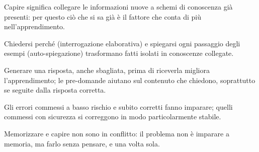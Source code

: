 \begin{sintesi}
  \item Capire significa collegare le informazioni nuove a schemi di
        conoscenza già presenti: per questo ciò che si sa già è il
        fattore che conta di più nell'apprendimento.
  \item Chiedersi perché (interrogazione elaborativa) e spiegarsi
        ogni passaggio degli esempi (auto-spiegazione) trasformano
        fatti isolati in conoscenze collegate.
  \item Generare una risposta, anche sbagliata, prima di riceverla
        migliora l'apprendimento; le pre-domande aiutano sul contenuto
        che chiedono, soprattutto se seguite dalla risposta corretta.
  \item Gli errori commessi a basso rischio e subito corretti fanno
        imparare; quelli commessi con sicurezza si correggono in modo
        particolarmente stabile.
  \item Memorizzare e capire non sono in conflitto: il problema non è
        imparare a memoria, ma farlo senza pensare, e una volta sola.
\end{sintesi}

\finecapitolo
